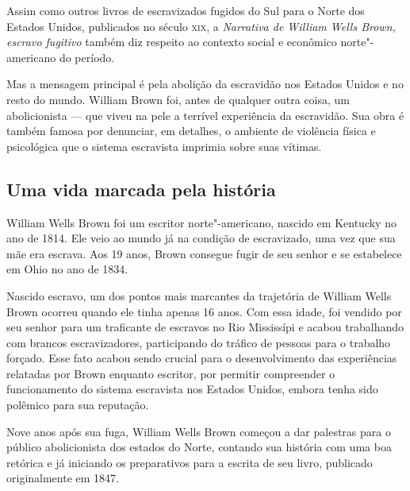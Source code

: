 \documentclass[12pt]{extarticle}
\begin{document}
Assim como outros livros de escravizados fugidos do Sul para o Norte dos
Estados Unidos, publicados no século \textsc{xix}, a \emph{Narrativa de William
Wells Brown, escravo fugitivo} também diz respeito ao contexto social e
econômico norte"-americano do período.

Mas a mensagem principal é pela abolição da escravidão nos Estados Unidos
e no resto do mundo. William Brown foi, antes de qualquer outra coisa, um abolicionista --- que viveu na pele a terrível experiência da escravidão. Sua obra é também famosa por denunciar, em detalhes, o ambiente de violência
física e psicológica que o sistema escravista imprimia sobre suas vítimas.


\subsection{Uma vida marcada pela história}

William Wells Brown foi um escritor norte"-americano, nascido em
Kentucky no ano de 1814. Ele veio ao mundo já na condição de
escravizado, uma vez que sua mãe era escrava. Aos 19 anos, Brown
consegue fugir de seu senhor e se estabelece em Ohio no ano de 1834.

Nascido escravo, um dos pontos mais marcantes da trajetória de William
Wells Brown ocorreu quando ele tinha apenas 16 anos. Com essa idade, foi
vendido por seu senhor para um traficante de escravos no Rio Mississípi
e acabou trabalhando com brancos escravizadores, participando do tráfico
de pessoas para o trabalho forçado. Esse fato acabou sendo crucial para
o desenvolvimento das experiências relatadas por Brown enquanto
escritor, por permitir compreender o funcionamento do sistema escravista
nos Estados Unidos, embora tenha sido polêmico para sua reputação.

Nove anos após sua fuga, William Wells Brown começou a dar palestras
para o público abolicionista dos estados do Norte, contando sua história
com uma boa retórica e já iniciando os preparativos para a escrita de seu
livro, publicado originalmente em 1847.
\end{document}
